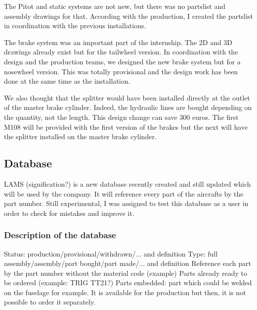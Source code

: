 \documentclass[11pt,a4paper]{report}
\begin{document}
\bigskip

The Pitot and static systems are not new, but there was no partslist and assembly drawings for that. According with the production, I created the partslist in coordination with the previous installations.

The brake system was an important part of the internship. The 2D and 3D drawings already exist but for the tailwheel version.
In coordination with the design and the production teams, we designed the new brake system but for a nosewheel version. This was totally provisional and the design work has been done at the same time as the installation.

We also thought that the splitter would have been installed directly at the outlet of the master brake cylinder. Indeed, the hydraulic lines are bought depending on the quantity, not the length. This design change can save 300 euros.
The first M108 will be provided with the first version of the brakes but the next will have the splitter installed on the master brake cylinder.

\subsection{Database}
LAMS (signification?) is a new database recently created and still updated which will be used by the company. It will reference every part of the aircrafts by the part number.
Still experimental, I was assigned to test this database as a user in order to check for mistakes and improve it.

\subsubsection{Description of the database}
Status: production/provisional/withdrawn/... and definition
Type: full assembly/assembly/part bought/part made/... and definition
Reference each part by the part number without the material code (example)
Parts already ready to be ordered (example: TRIG TT21?)
Parts embedded: part which could be welded on the fuselage for example. It is available for the production but then, it is not possible to order it separately.
\end{document}
